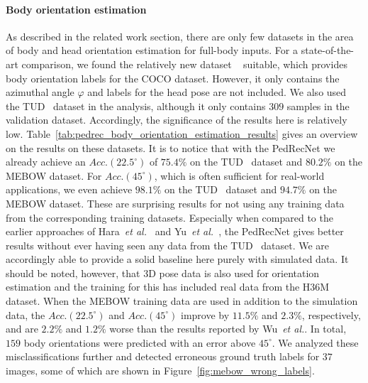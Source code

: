 \documentclass[a4paper, 10pt, conference]{ieeeconf}
\begin{document}
\paragraph{Body orientation estimation}
\label{sec:pedrec:results:orientation}
As described in the related work section, there are only few datasets in the area of body and head orientation estimation for full-body inputs. For a state-of-the-art comparison, we found the relatively new dataset ~\cite{wuMEBOWMonocularEstimation2020} suitable, which provides body orientation labels for the COCO dataset. However, it only contains the azimuthal angle $\varphi$ and labels for the head pose are not included. We also used the TUD~\cite{andrilukaMonocular3DPose2010} dataset in the analysis, although it only contains $309$ samples in the validation dataset. Accordingly, the significance of the results here is relatively low. Table~\ref{tab:pedrec_body_orientation_estimation_results} gives an overview on the results on these datasets. It is to notice that with the PedRecNet we already achieve an $Acc. (22.5^\circ)$ of $75.4\%$ on the TUD~\cite{andrilukaMonocular3DPose2010} dataset and $80.2\%$ on the MEBOW dataset. For $Acc. (45^\circ)$, which is often sufficient for real-world applications, we even achieve $98.1\%$ on the TUD~\cite{andrilukaMonocular3DPose2010} dataset and $94.7\%$ on the MEBOW dataset. These are surprising results for not using any training data from the corresponding training datasets. Especially when compared to the earlier approaches of Hara~\textit{et al.}~\cite{haraDesigningDeepConvolutional2017} and Yu~\textit{et al.}~\cite{yuContinuousPedestrianOrientation2019}, the PedRecNet gives better results without ever having seen any data from the TUD~\cite{andrilukaMonocular3DPose2010} dataset. We are accordingly able to provide a solid baseline here purely with simulated data. It should be noted, however, that 3D pose data is also used for orientation estimation and the training for this has included real data from the H36M dataset. When the MEBOW training data are used in addition to the simulation data, the $Acc. (22.5^\circ)$ and $Acc. (45^\circ)$ improve by $11.5\%$ and $2.3\%$, respectively, and are $2.2\%$ and $1.2\%$ worse than the results reported by Wu~\textit{et al.}. In total, $159$ body orientations were predicted with an error above $45^\circ$. We analyzed these misclassifications further and detected erroneous ground truth labels for $37$ images, some of which are shown in Figure~\ref{fig:mebow_wrong_labels}. 
\end{document}
